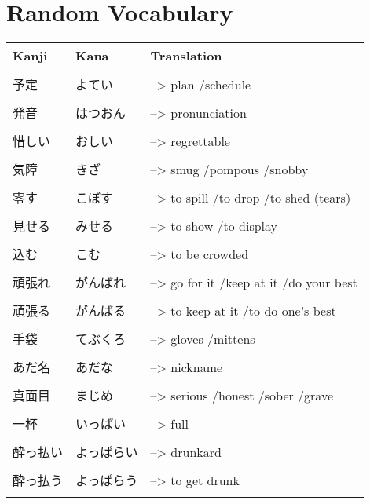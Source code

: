 \documentclass{article}
\begin{document}
\part*{Random Vocabulary}
\begin{tabular}{ l | l l }
Kanji&Kana&Translation\\ \hline\\[-1em]
予定				& よてい					&--> plan /schedule 						\\ \hline\\[-1em]
発音				& はつおん					&--> pronunciation 							\\ \hline\\[-1em]
惜しい			& おしい					&--> regrettable 							\\ \hline\\[-1em]
気障				& きざ 					&--> smug /pompous /snobby					\\ \hline\\[-1em]
零す				& こぼす					&--> to spill /to drop /to shed (tears)		\\ \hline\\[-1em]
見せる			& みせる					&--> to show /to display					\\ \hline\\[-1em]
込む				& こむ					&--> to be crowded							\\ \hline\\[-1em]
頑張れ			& がんばれ					&--> go for it /keep at it /do your best	\\ \hline\\[-1em]
頑張る			& がんばる 				&--> to keep at it /to do one's best		\\ \hline\\[-1em]
手袋				& てぶくろ					&--> gloves /mittens						\\ \hline\\[-1em]
あだ名			& あだな					&--> nickname								\\ \hline\\[-1em]
真面目			& まじめ					&--> serious /honest /sober /grave			\\ \hline\\[-1em]
一杯				& いっぱい					&--> full									\\ \hline\\[-1em]
酔っ払い			& よっぱらい				&--> drunkard								\\ \hline\\[-1em]
酔っ払う			& よっぱらう					&--> to get drunk						\\ \hline\\[-1em]

\end{tabular}
\end{document}
